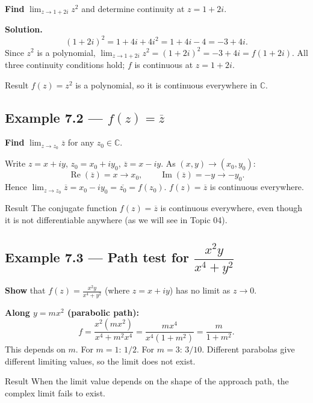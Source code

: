 \documentclass[12pt,a4paper]{article}
\begin{document}
\textbf{Find} $\lim_{z \to 1+2i} z^2$ and determine continuity at $z = 1+2i$.

\textbf{Solution.}
\[
  (1+2i)^2 = 1 + 4i + 4i^2 = 1 + 4i - 4 = -3 + 4i.
\]
Since $z^2$ is a polynomial, $\lim_{z \to 1+2i} z^2 = (1+2i)^2 = -3 + 4i = f(1+2i)$.
All three continuity conditions hold; $f$ is continuous at $z = 1+2i$.

\begin{learnbox}{Result}
$f(z) = z^2$ is a polynomial, so it is continuous everywhere in $\mathbb{C}$.
\end{learnbox}

\subsection*{Example 7.2 --- $f(z) = \overline{z}$}

\textbf{Find} $\lim_{z \to z_0} \overline{z}$ for any $z_0 \in \mathbb{C}$.

Write $z = x + iy$, $z_0 = x_0 + iy_0$, $\overline{z} = x - iy$.
As $(x,y) \to (x_0,y_0)$:
\[
  \operatorname{Re}(\overline{z}) = x \to x_0, \qquad
  \operatorname{Im}(\overline{z}) = -y \to -y_0.
\]
Hence $\lim_{z \to z_0} \overline{z} = x_0 - iy_0 = \overline{z_0} = f(z_0)$.
$f(z) = \overline{z}$ is continuous everywhere.

\begin{learnbox}{Result}
The conjugate function $f(z) = \overline{z}$ is continuous everywhere,
even though it is not differentiable anywhere (as we will see in Topic 04).
\end{learnbox}

\subsection*{Example 7.3 --- Path test for $\dfrac{x^2y}{x^4+y^2}$}

\textbf{Show} that $\displaystyle f(z) = \frac{x^2 y}{x^4 + y^2}$ (where $z = x+iy$)
has no limit as $z \to 0$.

\textbf{Along $y = mx^2$ (parabolic path):}
\[
  f = \frac{x^2(mx^2)}{x^4 + m^2x^4} = \frac{mx^4}{x^4(1+m^2)} = \frac{m}{1+m^2}.
\]
This depends on $m$.  For $m=1$: $1/2$.  For $m=3$: $3/10$.
Different parabolas give different limiting values, so the limit does not exist.

\begin{learnbox}{Result}
When the limit value depends on the shape of the approach path,
the complex limit fails to exist.
\end{learnbox}
\end{document}

